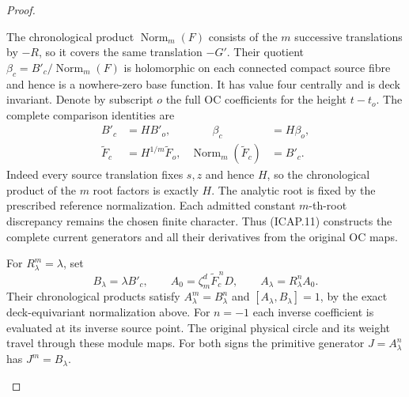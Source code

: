 \begin{proof}
\begin{enumerate}[label=\arabic*.]
The chronological product \(\operatorname{Norm}_m(F)\)
consists of the \(m\) successive translations by \(-R\),
so it covers the same translation \(-G'\).
Their quotient \(\beta_c=B'_c/\operatorname{Norm}_m(F)\)
is holomorphic on each connected compact source fibre and
hence is a nowhere-zero base function. It has value four
centrally and is deck invariant. Denote by subscript \(o\)
the full OC coefficients for the height \(t-t_o\).
The complete comparison identities are
\[
 \begin{aligned}
 B'_c&=H B'_o,&\qquad \beta_c&=H\beta_o,\\
 \widetilde F_c&=H^{1/m}\widetilde F_o,&
 \operatorname{Norm}_m(\widetilde F_c)&=B'_c.
 \end{aligned}                                         \tag{ICAP.11}
\]
Indeed every source translation fixes \(s,z\) and hence
\(H\), so the chronological product of the \(m\) root
factors is exactly \(H\). The analytic root is fixed by
the prescribed reference normalization. Each admitted constant
\(m\)-th-root discrepancy remains the chosen finite character.
Thus (ICAP.11) constructs the complete current generators and
all their derivatives from the original OC maps.

For \(R_\lambda^m=\lambda\), set
\[
 B_\lambda=\lambda B'_c,\qquad
 A_0=\zeta_m^d\widetilde F_c^{\,n}D,\qquad
 A_\lambda=R_\lambda^n A_0.
 \tag{ICAP.12}
\]
Their chronological products satisfy
\(A_\lambda^m=B_\lambda^n\) and
\([A_\lambda,B_\lambda]=1\), by the exact deck-equivariant
normalization above. For \(n=-1\) each inverse coefficient
is evaluated at its inverse source point. The original
physical circle and its weight travel through these module
maps. For both signs the primitive generator
\(J=A_\lambda^n\) has \(J^m=B_\lambda\).


\end{enumerate}
\end{proof}
